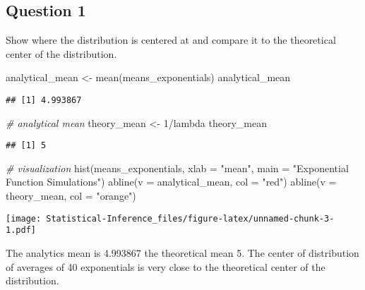 \documentclass[
]{article}
\newenvironment{Shaded}{\begin{snugshade}}{\end{snugshade}}
\newcommand{\AttributeTok}[1]{\textcolor[rgb]{0.77,0.63,0.00}{#1}}
\newcommand{\CommentTok}[1]{\textcolor[rgb]{0.56,0.35,0.01}{\textit{#1}}}
\newcommand{\DecValTok}[1]{\textcolor[rgb]{0.00,0.00,0.81}{#1}}
\newcommand{\FunctionTok}[1]{\textcolor[rgb]{0.00,0.00,0.00}{#1}}
\newcommand{\NormalTok}[1]{#1}
\newcommand{\OtherTok}[1]{\textcolor[rgb]{0.56,0.35,0.01}{#1}}
\newcommand{\SpecialCharTok}[1]{\textcolor[rgb]{0.00,0.00,0.00}{#1}}
\newcommand{\StringTok}[1]{\textcolor[rgb]{0.31,0.60,0.02}{#1}}
\begin{document}
\hypertarget{question-1}{%
\subsection{Question 1}\label{question-1}}

Show where the distribution is centered at and compare it to the
theoretical center of the distribution.

\begin{Shaded}
\begin{Highlighting}[]
\NormalTok{analytical\_mean }\OtherTok{\textless{}{-}} \FunctionTok{mean}\NormalTok{(means\_exponentials)}
\NormalTok{analytical\_mean}
\end{Highlighting}
\end{Shaded}

\begin{verbatim}
## [1] 4.993867
\end{verbatim}

\begin{Shaded}
\begin{Highlighting}[]
\CommentTok{\# analytical mean}
\NormalTok{theory\_mean }\OtherTok{\textless{}{-}} \DecValTok{1}\SpecialCharTok{/}\NormalTok{lambda}
\NormalTok{theory\_mean}
\end{Highlighting}
\end{Shaded}

\begin{verbatim}
## [1] 5
\end{verbatim}

\begin{Shaded}
\begin{Highlighting}[]
\CommentTok{\# visualization}
\FunctionTok{hist}\NormalTok{(means\_exponentials, }\AttributeTok{xlab =} \StringTok{"mean"}\NormalTok{, }\AttributeTok{main =} \StringTok{"Exponential Function Simulations"}\NormalTok{)}
\FunctionTok{abline}\NormalTok{(}\AttributeTok{v =}\NormalTok{ analytical\_mean, }\AttributeTok{col =} \StringTok{"red"}\NormalTok{)}
\FunctionTok{abline}\NormalTok{(}\AttributeTok{v =}\NormalTok{ theory\_mean, }\AttributeTok{col =} \StringTok{"orange"}\NormalTok{)}
\end{Highlighting}
\end{Shaded}

\texttt{[image: Statistical-Inference\_files/figure-latex/unnamed-chunk-3-1.pdf]}

The analytics mean is 4.993867 the theoretical mean 5. The center of
distribution of averages of 40 exponentials is very close to the
theoretical center of the distribution.
\end{document}
